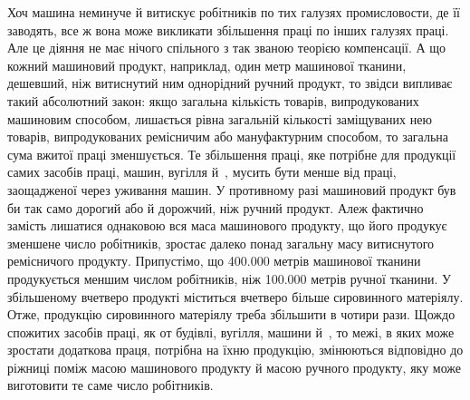 Хоч машина неминуче й витискує робітників по тих галузях
промисловости, де її заводять, все ж вона може викликати збільшення
праці по інших галузях праці. Але це діяння не має нічого
спільного з так званою теорією компенсації. А що кожний машиновий
продукт, наприклад, один метр машинової тканини, дешевший,
ніж витиснутий ним однорідний ручний продукт, то звідси випливає
такий абсолютний закон: якщо загальна кількість товарів,
випродукованих машиновим способом, лишається рівна загальній
кількості заміщуваних нею товарів, випродукованих ремісничим
або мануфактурним способом, то загальна сума вжитої праці
зменшується. Те збільшення праці, яке потрібне для продукції
самих засобів праці, машин, вугілля й~, мусить бути менше
від праці, заощадженої через уживання машин. У противному
разі машиновий продукт був би так само дорогий або й дорожчий,
ніж ручний продукт. Алеж фактично замість лишатися однаковою
вся маса машинового продукту, що його продукує зменшене
число робітників, зростає далеко понад загальну масу витиснутого
ремісничого продукту. Припустімо, що \num{400.000} метрів машинової
тканини продукується меншим числом робітників, ніж \num{100.000}
метрів ручної тканини. У збільшеному вчетверо продукті міститься
вчетверо більше сировинного матеріялу. Отже, продукцію
сировинного матеріялу треба збільшити в чотири рази. Щождо
спожитих засобів праці, як от будівлі, вугілля, машини й~,
то межі, в яких може зростати додаткова праця, потрібна на їхню
продукцію, змінюються відповідно до ріжниці поміж масою машинового
продукту й масою ручного продукту, яку може виготовити
те саме число робітників.


